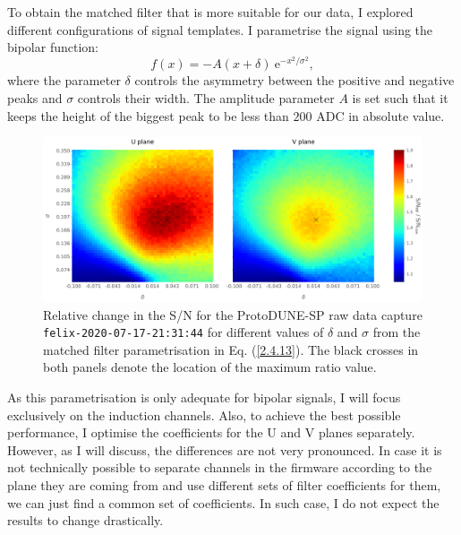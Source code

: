 To obtain the matched filter that is more suitable for our data, I explored different configurations of signal templates. I parametrise the signal using the bipolar function:
\begin{equation}\label{2.4.13}
	f(x) = -A (x + \delta) \ \mathrm{e}^{-x^{2}/\sigma^{2}},
\end{equation}
where the parameter $\delta$ controls the asymmetry between the positive and negative peaks and $\sigma$ controls their width. The amplitude parameter $A$ is set such that it keeps the height of the biggest peak to be less than $200$ ADC in absolute value.

\begin{figure}[t]
	\centering
	\includegraphics[width=1\linewidth]{Images/Matched_Filter/mf_fir_opt.png}
	\caption[Relative change in the S/N for the ProtoDUNE-SP raw data capture for different values of $\delta$ and $\sigma$ from the matched filter parametrisation.]{Relative change in the S/N for the ProtoDUNE-SP raw data capture \texttt{felix-2020-07-17-21:31:44} for different values of $\delta$ and $\sigma$ from the matched filter parametrisation in Eq. (\ref{2.4.13}). The black crosses in both panels denote the location of the maximum ratio value.}
	\label{fig:mf_opt}
\end{figure}

As this parametrisation is only adequate for bipolar signals, I will focus exclusively on the induction channels. Also, to achieve the best possible performance, I optimise the coefficients for the U and V planes separately. However, as I will discuss, the differences are not very pronounced. In case it is not technically possible to separate channels in the firmware according to the plane they are coming from and use different sets of filter coefficients for them, we can just find a common set of coefficients. In such case, I do not expect the results to change drastically.

